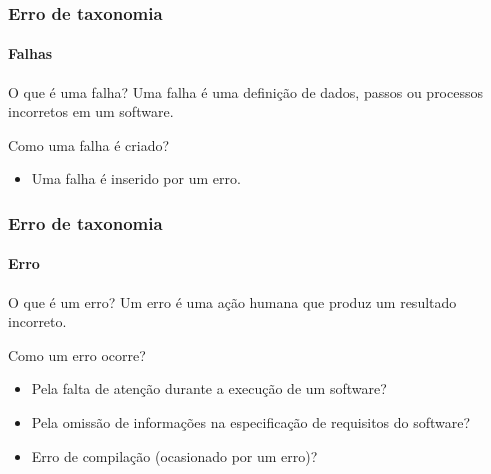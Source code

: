 \begin{frame}[parent={cmap:software-testing-foundations}, hasprev=false, hasnext=true]
\frametitle{Erro de taxonomia}
\framesubtitle{Falhas}
\label{concept:falhas}

\begin{block:concept}{O que é uma falha?}
Uma falha é uma definição de dados, passos ou processos incorretos em um software. 
\end{block:concept}

\begin{block:fact}{Como uma falha é criado?}
\begin{itemize}
	\item Uma falha é inserido por um erro.
\end{itemize}
\end{block:fact}

\hfill
{}
\end{frame}



\begin{frame}[hasprev=true, hasnext=true]
\label{concept:mistake}
\frametitle{Erro de taxonomia}
\framesubtitle{Erro}

\begin{block:concept}{O que é um erro?}
Um erro é uma ação humana que produz um resultado incorreto.
\end{block:concept}

\begin{block:fact}{Como um erro ocorre?}
\begin{itemize}
	\item Pela falta de atenção durante a execução de um software?

	\item Pela omissão de informações na especificação de requisitos do software?

	\item Erro de compilação (ocasionado por um erro)?
\end{itemize}
\end{block:fact}

\hfill
{}
\end{frame}



